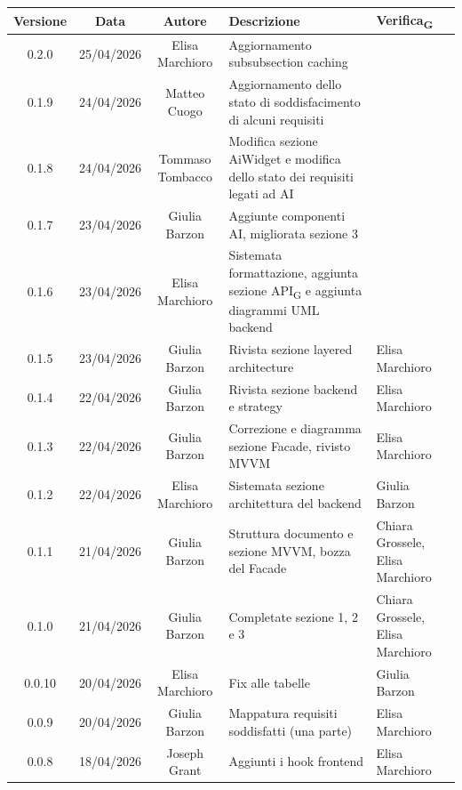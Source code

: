 \documentclass[11pt,a4paper]{article}
\newcommand{\gls}[1]{#1\textsubscript{G}}
\begin{document}
\begin{table}[H]
    \centering          
    \begin{tabular}{|c|c|c|>{\raggedright\arraybackslash}p{}|p{}|}
        \hline
        \textbf{Versione} & \textbf{Data} & \textbf{Autore} & \textbf{Descrizione} & \textbf{\gls{Verifica}} \\
        \hline
        0.2.0 & 25/04/2026 & Elisa Marchioro & Aggiornamento subsubsection caching & \\
        \hline
        0.1.9 & 24/04/2026 & Matteo Cuogo & Aggiornamento dello stato di soddisfacimento di alcuni requisiti & \\
        \hline
        0.1.8 & 24/04/2026 & Tommaso Tombacco & Modifica sezione AiWidget e modifica dello stato dei requisiti legati ad AI & \\
        \hline
        0.1.7 & 23/04/2026 & Giulia Barzon & Aggiunte componenti AI, migliorata sezione 3 & \\
        \hline
        0.1.6 & 23/04/2026 & Elisa Marchioro & Sistemata formattazione, aggiunta sezione \gls{API} e aggiunta diagrammi UML backend & \\
        \hline
        0.1.5 & 23/04/2026 & Giulia Barzon & Rivista sezione layered architecture & Elisa Marchioro\\
        \hline
        0.1.4 & 22/04/2026 & Giulia Barzon & Rivista sezione backend e strategy & Elisa Marchioro\\
        \hline
        0.1.3 & 22/04/2026 & Giulia Barzon & Correzione e diagramma sezione Facade, rivisto MVVM & Elisa Marchioro\\
        \hline
        0.1.2 & 22/04/2026 & Elisa Marchioro & Sistemata sezione architettura del backend & Giulia Barzon \\
        \hline
        0.1.1 & 21/04/2026 & Giulia Barzon & Struttura documento e sezione MVVM, bozza del Facade & Chiara Grossele, Elisa Marchioro\\
        \hline
        0.1.0 & 21/04/2026 & Giulia Barzon & Completate sezione 1, 2 e 3 & Chiara Grossele, Elisa Marchioro\\
        \hline
        0.0.10 & 20/04/2026 & Elisa Marchioro & Fix alle tabelle & Giulia Barzon\\
        \hline
        0.0.9 & 20/04/2026 & Giulia Barzon & Mappatura requisiti soddisfatti (una parte) & Elisa Marchioro\\
        \hline
        0.0.8 & 18/04/2026 & Joseph Grant & Aggiunti i hook frontend & Elisa Marchioro\\

\end{tabular}
\end{table}
\end{document}
